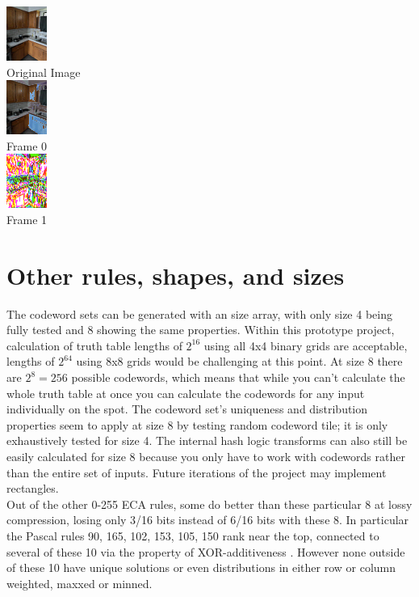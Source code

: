 \documentclass[11pt]{article}
\begin{document}
\begin{center}
\includegraphics{kitchenShrunkresized}\\
Original Image\\
\includegraphics{kitchenShrunkframes0}\\
Frame 0\\
\includegraphics{kitchenShrunkframes1}\\
Frame 1\\
\end{center}

\section{Other rules, shapes, and sizes}

The codeword sets can be generated with an size array, with only size 4 being fully tested and 8 showing the same properties. Within this prototype project, calculation of truth table lengths of $2^{16}$ using all 4x4 binary grids are acceptable, lengths of $2^{64}$ using 8x8 grids would be challenging at this point. At size 8 there are $2^8=256$ possible codewords, which means that while you can't calculate the whole truth table at once you can calculate the codewords for any input individually on the spot. The codeword set's uniqueness and distribution properties seem to apply at size 8 by testing random codeword tile; it is only exhaustively tested for size 4. The internal hash logic transforms can also still be easily calculated for size 8 because you only have to work with codewords rather than the entire set of inputs. Future iterations of the project may implement rectangles.\\

Out of the other 0-255 ECA rules, some do better than these particular 8 at lossy compression, losing only 3/16 bits instead of 6/16 bits with these 8. In particular the Pascal rules 90, 165, 102, 153, 105, 150 rank near the top, connected to several of these 10 via the property of XOR-additiveness \cite{xorAdditive}. However none outside of these 10 have unique solutions or even distributions in either row or column weighted, maxxed or minned.\\
\end{document}
